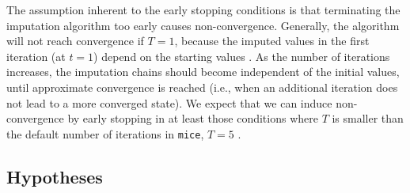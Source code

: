 \documentclass[Royal,times,sageh]{sagej}
\begin{document}
The assumption inherent to the early stopping conditions is that terminating the imputation algorithm too early causes non-convergence. Generally, the algorithm will not reach convergence if \(T=1\), because the imputed values in the first iteration (at \(t=1\)) depend on the starting values \citep[which are sampled randomly from the set of observed datapoints;][]{buur18}. As the number of iterations increases, the imputation chains should become independent of the initial values, until approximate convergence is reached (i.e., when an additional iteration does not lead to a more converged state). We expect that we can induce non-convergence by early stopping in at least those conditions where \(T\) is smaller than the default number of iterations in \texttt{mice}, \(T=5\) \citep{mice}.

\hypertarget{hypotheses}{%
\subsection{Hypotheses}\label{hypotheses}}
\end{document}

